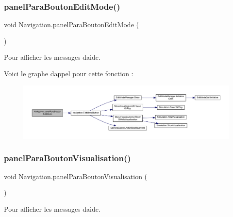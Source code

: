 \subsubsection{\texorpdfstring{panel\+Para\+Bouton\+Edit\+Mode()}{panelParaBoutonEditMode()}}
{\footnotesize\ttfamily void Navigation.\+panel\+Para\+Bouton\+Edit\+Mode (\begin{DoxyParamCaption}{ }\end{DoxyParamCaption})\hspace{0.3cm}{\ttfamily [inline]}}



Pour afficher les messages d\textquotesingle{}aide. 

Voici le graphe d\textquotesingle{}appel pour cette fonction \+:\nopagebreak
\begin{figure}[H]
\begin{center}
\leavevmode
\includegraphics[width=350pt]{class_navigation_a9a7bb527269069e0c083ef70291d4fb3_cgraph}
\end{center}
\end{figure}
\mbox{\label{class_navigation_a70f344f826956e694febdfb6fb693af4}} 
\subsubsection{\texorpdfstring{panel\+Para\+Bouton\+Visualisation()}{panelParaBoutonVisualisation()}}
{\footnotesize\ttfamily void Navigation.\+panel\+Para\+Bouton\+Visualisation (\begin{DoxyParamCaption}{ }\end{DoxyParamCaption})\hspace{0.3cm}{\ttfamily [inline]}}



Pour afficher les messages d\textquotesingle{}aide. 

